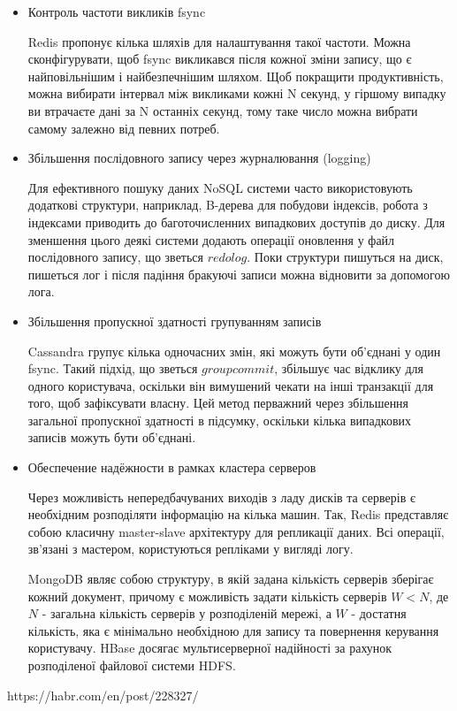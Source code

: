 \documentclass[14pt]{vakthesis}
\begin{document}
\begin{itemize}

\item Контроль частоти викликів fsync

Redis пропонує кілька шляхів для налаштування такої частоти. Можна сконфігурувати, щоб fsync викликався після кожної зміни запису,
що є найповільнішим і найбезпечнішим шляхом. Щоб покращити продуктивність, можна вибирати інтервал між викликами кожні N секунд,
у гіршому випадку ви втрачаєте дані за N останніх секунд, тому таке число можна вибрати самому залежно від певних потреб.

\item Збільшення послідовного запису через журналювання (logging)

Для ефективного пошуку даних NoSQL системи часто використовують додаткові структури, наприклад, B-дерева для побудови індексів, робота 
з індексами приводить до баготочисленних випадкових доступів до диску. Для зменшення цього деякі системи додають операції
оновлення у файл послідовного запису, що зветься $redo log$. Поки структури пишуться на диск, пишеться лог і після падіння
бракуючі записи можна відновити за допомогою лога.

\item Збільшення пропускної здатності групуванням записів

Cassandra групує кілька одночасних змін, які можуть бути об'єднані у один fsync. Такий підхід, що зветься $group commit$,
збільшує час відклику для одного користувача, оскільки він вимушений чекати на інші транзакції для того, щоб зафіксувати власну.
Цей метод перважний через збільшення загальної пропускної здатності в підсумку, оскільки кілька випадкових записів можуть бути об'єднані.

\item Обеспечение надёжности в рамках кластера серверов

Через можливість непередбачуваних виходів з ладу дисків та серверів є необхідним розподіляти інформацію на кілька машин.
Так, Redis представляє собою класичну master-slave архітектуру для репликації даних. Всі операції, зв'язані з мастером,
користуються репліками у вигляді логу.

MongoDB являє собою структуру, в якій задана кількість серверів зберігає кожний документ, причому є
можливість задати кількість серверів $W < N$, де $N$ - загальна кількість серверів у розподіленій мережі, а $W$ - достатня кількість,
яка є мінімально необхідною для запису та повернення керування користувачу.
HBase досягає мультисерверної надійності за рахунок розподіленої файлової системи HDFS.

\end{itemize}
https://habr.com/en/post/228327/
\end{document}

